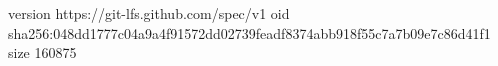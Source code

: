 version https://git-lfs.github.com/spec/v1
oid sha256:048dd1777c04a9a4f91572dd02739feadf8374abb918f55c7a7b09e7c86d41f1
size 160875
